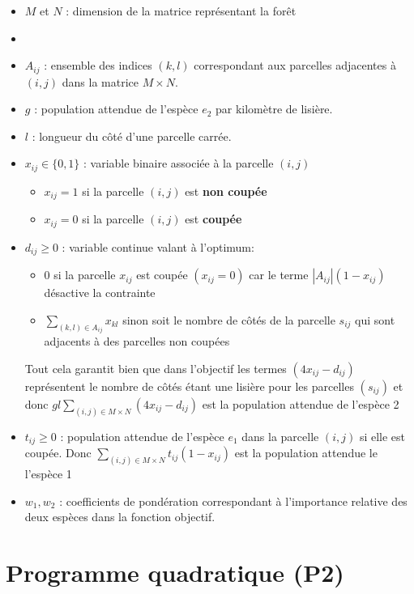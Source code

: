 \documentclass[a4paper,11pt]{article}
\begin{document}
\begin{itemize}
    \item $M$ et $N$ : dimension de la matrice représentant la forêt
    \item \item $A_{ij}$ : ensemble des indices $(k,l)$ correspondant aux parcelles adjacentes à $(i,j)$ dans la matrice $M \times N$.
    \item $g$ : population attendue de l'espèce $e_2$ par kilomètre de lisière.
    \item $l$ : longueur du côté d’une parcelle carrée.
    \item $x_{ij} \in \{0,1\}$ : variable binaire associée à la parcelle $(i,j)$
    \begin{itemize}
        \item $x_{ij} = 1$ si la parcelle $(i,j)$ est \textbf{non coupée}
        \item $x_{ij} = 0$ si la parcelle $(i,j)$ est \textbf{coupée}
    \end{itemize}

    \item {$d_{ij} \ge 0$ : variable continue valant à l'optimum:
    
    \begin{itemize}
    \item $0$ si la parcelle $x_{ij}$ est coupée $(x_{ij} = 0)$ car le terme $|A_{ij}|(1-x_{ij})$ désactive la contrainte
    \item $\sum_{(k,l)\in A_{ij}} x_{kl}$ sinon soit le nombre de côtés de la parcelle $s_{ij}$ qui sont adjacents à des parcelles non coupées 
    \end{itemize} 
    
    Tout cela garantit bien que dans l'objectif les termes $(4x_{ij} - d_{ij})$ représentent le nombre de côtés étant une lisière pour les parcelles $(s_{ij})$ et donc 
    $g l \sum_{(i,j)\in M\times N} (4x_{ij} - d_{ij})$ est la population attendue de l'espèce 2}
    \item $t_{ij} \ge 0$ : population attendue de l'espèce $e_1$ dans la parcelle $(i,j)$ si elle est coupée.
    Donc $\sum_{(i,j)\in M\times N} t_{ij}(1 - x_{ij})$ est la population attendue le l'espèce 1
    \item $w_1, w_2$ : coefficients de pondération correspondant à l’importance relative des deux espèces dans la fonction objectif.
\end{itemize}

\section{Programme quadratique (P2)}
\end{document}
